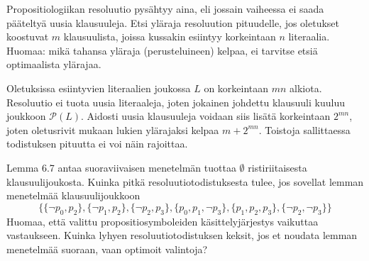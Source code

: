 \documentclass[11pt,a4paper]{amsart}
\begin{document}
\begin{exercise}
Propositiologiikan resoluutio pysähtyy aina, eli jossain vaiheessa ei saada
pääteltyä uusia klausuuleja. Etsi yläraja resoluution pituudelle, jos
oletukset koostuvat \(m\) klausuulista, joissa kussakin esiintyy korkeintaan
\(n\) literaalia. Huomaa: mikä tahansa yläraja (perusteluineen) kelpaa,
ei tarvitse etsiä optimaalista ylärajaa.
\end{exercise}

\begin{solution}
Oletuksissa esiintyvien literaalien joukossa \(L\) on korkeintaan
\(mn\) alkiota. Resoluutio ei tuota uusia literaaleja, joten jokainen
johdettu klausuuli kuuluu joukkoon \(\mathcal P(L)\). Aidosti uusia
klausuuleja voidaan siis lisätä korkeintaan \(2^{mn}\), joten oletusrivit
mukaan lukien ylärajaksi kelpaa \(m+2^{mn}\). Toistoja sallittaessa
todistuksen pituutta ei voi näin rajoittaa.
\end{solution}

\begin{exercise}
Lemma 6.7 antaa suoraviivaisen menetelmän tuottaa \(\emptyset\)
ristiriitaisesta klausuulijoukosta. Kuinka pitkä resoluutiotodistuksesta
tulee, jos sovellat lemman menetelmää klausuulijoukkoon
\[
\{\{\neg p_0, p_2\}, \{\neg p_1, p_2\}, \{\neg p_2, p_3\},
\{p_0, p_1, \neg p_3\}, \{p_1, p_2, p_3\}, \{\neg p_2, \neg p_3\}\}
\]
Huomaa, että valittu propositiosymboleiden käsittelyjärjestys vaikuttaa
vastaukseen. Kuinka lyhyen resoluutiotodistuksen keksit, jos et noudata
lemman menetelmää suoraan, vaan optimoit valintoja?
\end{exercise}
\end{document}

